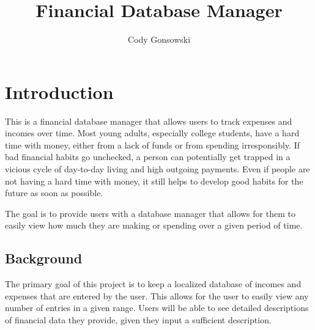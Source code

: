 \documentclass[10pt,conference,onecolumn,compsoc]{IEEEtran}
\begin{document}
\title{Financial Database Manager}

\author{Cody Gonsowski}%



\maketitle


\IEEEdisplaynontitleabstractindextext
\IEEEpeerreviewmaketitle


\section{Introduction}
This is a financial database manager that allows users to track expenses and incomes over time. Most young adults, especially college students, have a hard time with money, either from a lack of funds or from spending irresponsibly. If bad financial habits go unchecked, a person can potentially get trapped in a vicious cycle of day-to-day living and high outgoing payments. Even if people are not having a hard time with money, it still helps to develop good habits for the future as soon as possible.

The goal is to provide users with a database manager that allows for them to easily view how much they are making or spending over a given period of time.


\subsection{Background}
The primary goal of this project is to keep a localized database of incomes and expenses that are entered by the user. This allows for the user to easily view any number of entries in a given range. Users will be able to see detailed descriptions of financial data they provide, given they input a sufficient description.
\end{document}
